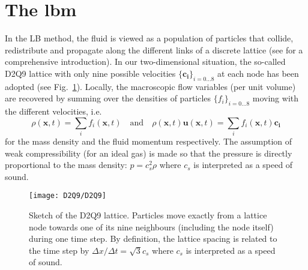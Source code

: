 \section{The \acl{lbm}}
\label{app:lbm}

In the LB method, the fluid is viewed as a population of particles that collide, redistribute and propagate along the different links of a discrete lattice (see \cite{kruger_lattice_2017} for a comprehensive introduction).
In our two-dimensional situation, the so-called D2Q9 lattice with only nine possible velocities $\{\mathbf{c_i}\}_{i=0...8}$ at each node has been adopted (see  Fig.~\ref{fig:D2Q9}).
Locally, the macroscopic flow variables (per unit volume) are recovered by summing over the densities of particles $\{f_i\}_{i=0...8}$ moving with the different velocities, i.e.
\[
\rho(\mathbf{x},t) = \sum_i f_i(\mathbf{x},t) \quad \mathrm{and}\quad \rho(\mathbf{x},t) \mathbf u(\mathbf{x},t) = \sum_i f_i(\mathbf{x},t) \mathbf{c_i}
\]
for the mass density and the fluid momentum respectively. The assumption of weak compressibility (for an ideal gas) is made so that the pressure is directly proportional to the mass density: $p = c_s^2 \rho$ where $c_s$ is interpreted as a speed of sound.

\begin{figure}
	\centering
	\texttt{[image: D2Q9/D2Q9]}
	\caption{Sketch of the D2Q9 lattice. Particles move exactly from a lattice node towards one of its nine neighbours (including the node itself) during one time step. By definition, the lattice spacing is related to the time step by $\Delta x/ \Delta t = \sqrt{3} c_s$ where $c_s$ is interpreted as a speed of sound.}
	\label{fig:D2Q9}
\end{figure}


